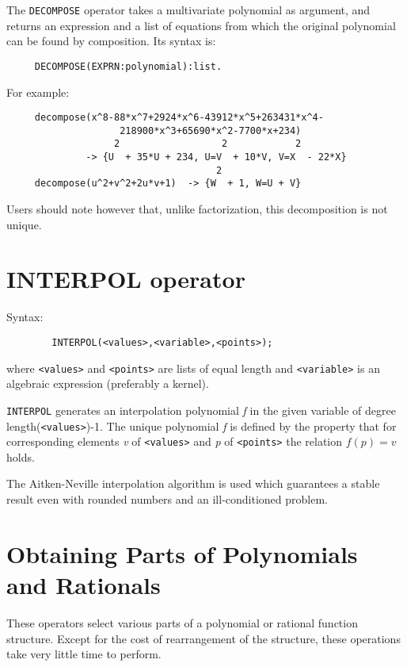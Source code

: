 The {\tt DECOMPOSE} operator takes a multivariate polynomial as argument,
and returns an expression and a list of equations from which the
original polynomial can be found by composition.  Its syntax is:
\begin{verbatim}
     DECOMPOSE(EXPRN:polynomial):list.
\end{verbatim}
For example:
\begin{verbatim}
     decompose(x^8-88*x^7+2924*x^6-43912*x^5+263431*x^4-
                    218900*x^3+65690*x^2-7700*x+234)
                   2                  2            2
              -> {U  + 35*U + 234, U=V  + 10*V, V=X  - 22*X}
                                     2
     decompose(u^2+v^2+2u*v+1)  -> {W  + 1, W=U + V}
\end{verbatim}
Users should note however that, unlike factorization, this decomposition
is not unique.

\section{INTERPOL operator}
\hypertarget{operator:INTERPOL}{}

Syntax:
\begin{verbatim}
        INTERPOL(<values>,<variable>,<points>);
\end{verbatim}

where {\tt <values>} and {\tt <points>} are lists of equal length and
{\tt <variable>} is an algebraic expression (preferably a kernel).

{\tt INTERPOL} generates an interpolation polynomial {\em f\/} in the given
variable of degree length({\tt <values>})-1.  The unique polynomial {\em f\/}
is defined by the property that for corresponding elements {\em v\/} of
{\tt <values>} and {\em p\/} of {\tt <points>} the relation $f(p)=v$ holds.

The Aitken-Neville interpolation algorithm is used which guarantees a
stable result even with rounded numbers and an ill-conditioned problem.

\section{Obtaining Parts of Polynomials and Rationals}

These operators select various parts of a polynomial or rational function
structure. Except for the cost of rearrangement of the structure, these
operations take very little time to perform.

